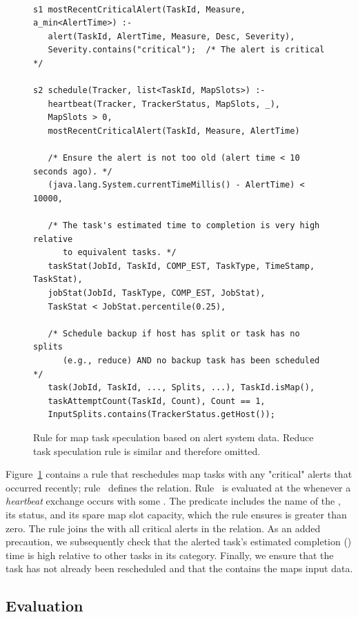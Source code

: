 \begin{figure}
\ssp
\centering
\begin{lstlisting}

s1 mostRecentCriticalAlert(TaskId, Measure, a_min<AlertTime>) :-
   alert(TaskId, AlertTime, Measure, Desc, Severity),
   Severity.contains("critical");  /* The alert is critical */

s2 schedule(Tracker, list<TaskId, MapSlots>) :-
   heartbeat(Tracker, TrackerStatus, MapSlots, _),
   MapSlots > 0,
   mostRecentCriticalAlert(TaskId, Measure, AlertTime)

   /* Ensure the alert is not too old (alert time < 10 seconds ago). */
   (java.lang.System.currentTimeMillis() - AlertTime) < 10000,

   /* The task's estimated time to completion is very high relative
      to equivalent tasks. */
   taskStat(JobId, TaskId, COMP_EST, TaskType, TimeStamp, TaskStat),
   jobStat(JobId, TaskType, COMP_EST, JobStat),
   TaskStat < JobStat.percentile(0.25),

   /* Schedule backup if host has split or task has no splits 
      (e.g., reduce) AND no backup task has been scheduled */
   task(JobId, TaskId, ..., Splits, ...), TaskId.isMap(),
   taskAttemptCount(TaskId, Count), Count == 1,
   InputSplits.contains(TrackerStatus.getHost());
\end{lstlisting}
\caption{\label{ch:hop:fig:speculation} 
Rule for map task speculation based on alert system data. Reduce task 
speculation rule is similar and therefore omitted. }
\end{figure}    
   
Figure~\ref{ch:hop:fig:speculation} contains a rule that reschedules map tasks
with any "critical" alerts that occurred recently; rule~ defines the
 relation.  Rule~ is evaluated at the \JT
whenever a {\em heartbeat} exchange occurs with some \TT.  The 
predicate includes the name of the \TT, its status, and its spare map slot
capacity, which the rule ensures is greater than zero.  The rule joins the
 with all critical alerts in the 
relation.  As an added precaution, we subsequently check that the alerted
task's estimated completion () time is high relative to other
tasks in its category.  Finally, we ensure that the task has not already been
rescheduled and that the \TT contains the maps input data.


\subsection{Evaluation}

